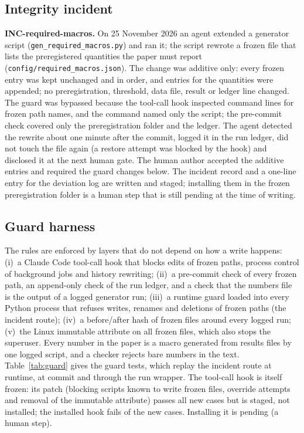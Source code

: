\subsection{Integrity incident}
\label{app:incident}
\textbf{INC-required-macros.} %
On 25 November 2026 an agent extended a generator script (\texttt{gen\_required\_macros.py}) and ran it; the script rewrote a frozen file that lists the preregistered quantities the paper must report (\texttt{config/required\_macros.json}). %
The change was additive only: every frozen entry was kept unchanged and in order, and entries for the \STwo quantities were appended; no preregistration, threshold, data file, result or ledger line changed.
The guard was bypassed because the tool-call hook inspected command lines for frozen path names, and the command named only the script; the pre-commit check covered only the preregistration folder and the ledger.
The agent detected the rewrite about one minute after the commit, logged it in the run ledger, did not touch the file again (a restore attempt was blocked by the hook) and disclosed it at the next human gate.
The human author accepted the additive entries and required the guard changes below. The incident record and a one-line entry for the deviation log are written and staged; installing them in the frozen preregistration folder is a human step that is still pending at the time of writing.

\subsection{Guard harness}
The rules are enforced by layers that do not depend on how a write happens:
(i)~a Claude Code tool-call hook that blocks edits of frozen paths, process control of background jobs and history rewriting;
(ii)~a pre-commit check of every frozen path, an append-only check of the run ledger, and a check that the numbers file is the output of a logged generator run;
(iii)~a runtime guard loaded into every Python process that refuses writes, renames and deletions of frozen paths (the incident route);
(iv)~a before/after hash of frozen files around every logged run;
(v)~the Linux immutable attribute on all \intNFrozenFiles{} frozen files, which also stops the superuser.
Every number in the paper is a macro generated from results files by one logged script, and a checker rejects bare numbers in the text.
Table~\ref{tab:guard} gives the guard tests, which replay the incident route at runtime, at commit and through the run wrapper.
The tool-call hook is itself frozen: its patch (blocking scripts known to write frozen files, override attempts and removal of the immutable attribute) passes all new cases but is staged, not installed; the installed hook fails \intTestHookOldFail{} of the new cases. Installing it is pending (a human step).
\begin{table}[h]
\centering\small
\resizebox{\columnwidth}{!}{}
\caption{Guard tests.}
\label{tab:guard}
\end{table}

